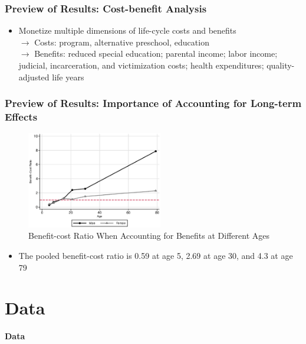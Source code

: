 \documentclass[static]{JJH-Beamer}
\begin{document}

\begin{frame}
\frametitle{Preview of Results: Cost-benefit Analysis}
	\begin{itemize}
		\item Monetize multiple dimensions of life-cycle costs and benefits \\
			$\rightarrow$ Costs: program, alternative preschool, education \\ 
			$\rightarrow$ Benefits: reduced special education; parental income; labor income; judicial, incarceration, and victimization costs; health expenditures; quality-adjusted life years 
	\end{itemize}
	\centering
	\scalebox{.85}{}
\end{frame}


\begin{frame}
\frametitle{Preview of Results: Importance of Accounting for Long-term Effects}
\begin{figure}
\caption{Benefit-cost Ratio When Accounting for Benefits at Different Ages}
	\includegraphics[width=16em]{AppOutput/Sensitivity/bcr_age.eps}
\end{figure}
\begin{itemize}
	\item The pooled benefit-cost ratio is 0.59 at age 5, 2.69 at age 30, and 4.3 at age 79
\end{itemize}
\end{frame}

\section{Data}

\begin{frame}[noframenumbering]

\begin{block}{}
\begin{center}
\textbf{Data}
\end{center}
\end{block}

\end{frame}
\end{document}
